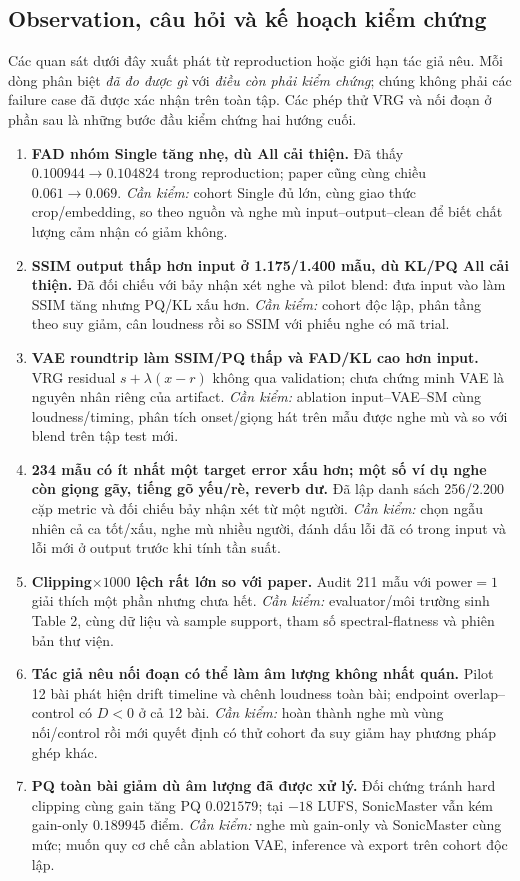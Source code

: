 \documentclass[10pt,a4paper]{article}
\begin{document}
\subsection{Observation, câu hỏi và kế hoạch kiểm chứng}
Các quan sát dưới đây xuất phát từ reproduction hoặc giới hạn tác giả nêu. Mỗi dòng phân biệt \emph{đã đo được gì} với \emph{điều còn phải kiểm chứng}; chúng không phải các failure case đã được xác nhận trên toàn tập. Các phép thử VRG và nối đoạn ở phần sau là những bước đầu kiểm chứng hai hướng cuối.
\begin{enumerate}
\item \textbf{FAD nhóm Single tăng nhẹ, dù All cải thiện.} Đã thấy $0.100944\to0.104824$ trong reproduction; paper cũng cùng chiều $0.061\to0.069$. \emph{Cần kiểm:} cohort Single đủ lớn, cùng giao thức crop/embedding, so theo nguồn và nghe mù input--output--clean để biết chất lượng cảm nhận có giảm không.
\item \textbf{SSIM output thấp hơn input ở 1.175/1.400 mẫu, dù KL/PQ All cải thiện.} Đã đối chiếu với bảy nhận xét nghe và pilot blend: đưa input vào làm SSIM tăng nhưng PQ/KL xấu hơn. \emph{Cần kiểm:} cohort độc lập, phân tầng theo suy giảm, cân loudness rồi so SSIM với phiếu nghe có mã trial.
\item \textbf{VAE roundtrip làm SSIM/PQ thấp và FAD/KL cao hơn input.} VRG residual $s+\lambda(x-r)$ không qua validation; chưa chứng minh VAE là nguyên nhân riêng của artifact. \emph{Cần kiểm:} ablation input--VAE--SM cùng loudness/timing, phân tích onset/giọng hát trên mẫu được nghe mù và so với blend trên tập test mới.
\item \textbf{234 mẫu có ít nhất một target error xấu hơn; một số ví dụ nghe còn giọng gãy, tiếng gõ yếu/rè, reverb dư.} Đã lập danh sách 256/2.200 cặp metric và đối chiếu bảy nhận xét từ một người. \emph{Cần kiểm:} chọn ngẫu nhiên cả ca tốt/xấu, nghe mù nhiều người, đánh dấu lỗi đã có trong input và lỗi mới ở output trước khi tính tần suất.
\item \textbf{Clipping$\times1000$ lệch rất lớn so với paper.} Audit 211 mẫu với $\mathrm{power}=1$ giải thích một phần nhưng chưa hết. \emph{Cần kiểm:} evaluator/môi trường sinh Table 2, cùng dữ liệu và sample support, tham số spectral-flatness và phiên bản thư viện.
\item \textbf{Tác giả nêu nối đoạn có thể làm âm lượng không nhất quán.} Pilot 12 bài phát hiện drift timeline và chênh loudness toàn bài; endpoint overlap--control có $D<0$ ở cả 12 bài. \emph{Cần kiểm:} hoàn thành nghe mù vùng nối/control rồi mới quyết định có thử cohort đa suy giảm hay phương pháp ghép khác.
\item \textbf{PQ toàn bài giảm dù âm lượng đã được xử lý.} Đối chứng tránh hard clipping cùng gain tăng PQ $0.021579$; tại $-18$ LUFS, SonicMaster vẫn kém gain-only $0.189945$ điểm. \emph{Cần kiểm:} nghe mù gain-only và SonicMaster cùng mức; muốn quy cơ chế cần ablation VAE, inference và export trên cohort độc lập.
\end{enumerate}
\end{document}
